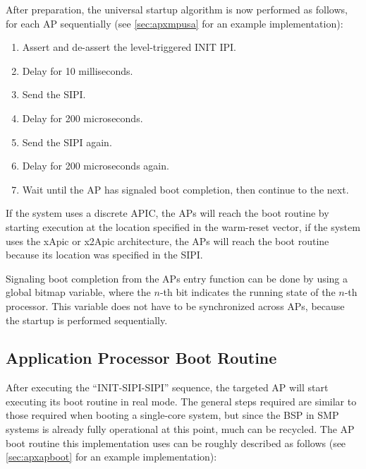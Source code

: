 After preparation, the universal startup algorithm is now performed as follows, for each AP
sequentially (see \autoref{sec:apxmpusa} for an example implementation):

\begin{enumerate}
  \item Assert and de-assert the level-triggered INIT IPI\@.
  \item Delay for 10 milliseconds.
  \item Send the SIPI\@.
  \item Delay for 200 microseconds.
  \item Send the SIPI again.
  \item Delay for 200 microseconds again.
  \item Wait until the AP has signaled boot completion, then continue to the next.
\end{enumerate}

If the system uses a discrete APIC, the APs will reach the boot routine by starting execution at
the location specified in the warm-reset vector, if the system uses the xApic or x2Apic
architecture, the APs will reach the boot routine because its location was specified in the SIPI\@.

Signaling boot completion from the APs entry function can be done by using a global bitmap
variable, where the \(n\)-th bit indicates the running state of the \(n\)-th processor. This
variable does not have to be synchronized across APs, because the startup is performed
sequentially.

\subsection{Application Processor Boot Routine}
\label{subsec:apboot}

After executing the ``INIT-SIPI-SIPI'' sequence, the targeted AP will start executing its boot
routine in real mode. The general steps required are similar to those required when booting a
single-core system, but since the BSP in SMP systems is already fully operational at this point,
much can be recycled. The AP boot routine this implementation uses can be roughly described as
follows (see \autoref{sec:apxapboot} for an example implementation):

